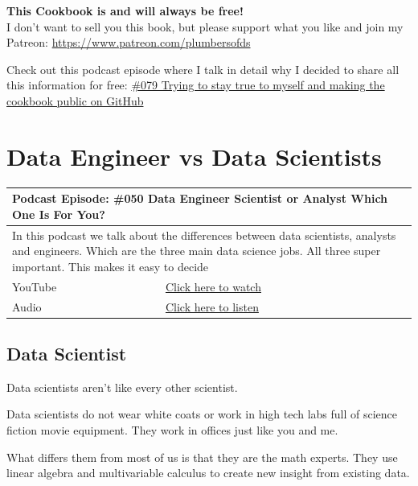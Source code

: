 \documentclass[12pt, numbers=noenddot]{scrreprt} %
\begin{document}
\textbf{This Cookbook is and will always be free! }\\
I don't want to sell you this book, but please support what you like and join my Patreon: \url{https://www.patreon.com/plumbersofds} 

Check out this podcast episode where I talk in detail why I decided to share all this information for free: 
\href{https://youtu.be/k1bS5aSPos8}{\#079 Trying to stay true to myself and making the cookbook public on GitHub}

\pagebreak

\chapter{Data Engineer vs Data Scientists}

\begin{table}[h]
\begin{tabular}{ll}
\hline
\multicolumn{2}{l}{\textbf{Podcast Episode:} \#050 Data Engineer Scientist or Analyst Which One Is For You?} \\ \hline
\multicolumn{2}{p{15cm}}{In this podcast we talk about the differences between data scientists, analysts and engineers. Which are the three main data science jobs. All three super important. This makes it easy to decide}         \\ \hline
\multicolumn{1}{l|}{YouTube}   & \href{https://youtu.be/64TYZETOEdQ}{Click here to watch}   \\ 
\multicolumn{1}{l|}{Audio}     & \href{https://anchor.fm/andreaskayy/episodes/050-Data-Engineer-Scientist-or-Analyst-Which-One-Is-For-You-e45ibl}{Click here to listen}   \\ \hline
\end{tabular}
\end{table}

\section{Data Scientist}
Data scientists aren’t like every other scientist.

Data scientists do not wear white coats or work in high tech labs full of science fiction movie equipment. They work in offices just like you and me.

What differs them from most of us is that they are the math experts. They use linear algebra and multivariable calculus to create new insight from existing data.
\end{document}
